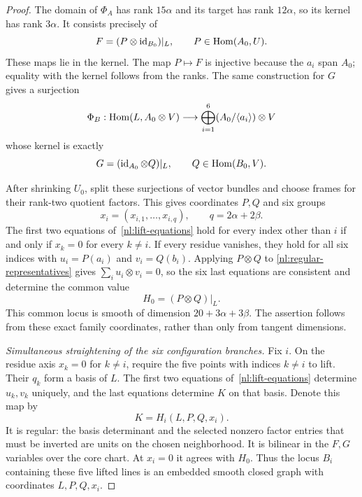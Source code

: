 \begin{proof}
The domain of $\Phi_A$ has rank $15\alpha$ and its target has rank
$12\alpha$, so its kernel has rank $3\alpha$. It consists precisely of
\begin{equation}\label{nl:kernel-A}
 F=(P\otimes\operatorname{id}_{B_0})|_L,
             \qquad P\in\operatorname{Hom}(A_0,U).
\end{equation}
These maps lie in the kernel. The map $P\mapsto F$ is injective because
the $a_i$ span $A_0$; equality with the kernel follows from the ranks.
The same construction for $G$ gives a surjection
\[
 \Phi_B:\operatorname{Hom}(L,A_0\otimes V)\longrightarrow
        \bigoplus_{i=1}^6(A_0/\langle a_i\rangle)\otimes V
\]
whose kernel is exactly
\begin{equation}\label{nl:kernel-B}
 G=(\operatorname{id}_{A_0}\otimes Q)|_L,
             \qquad Q\in\operatorname{Hom}(B_0,V).
\end{equation}

After shrinking $U_0$, split these surjections of vector bundles and
choose frames for their rank-two quotient factors. This gives coordinates
$P,Q$ and six groups
\[
 x_i=(x_{i,1},\ldots,x_{i,q}),\qquad
 q=2\alpha+2\beta.
\]
The first two equations of~\eqref{nl:lift-equations} hold for every
index other than $i$ if and only if $x_k=0$ for every $k\neq i$.
If every residue vanishes, they hold for all six indices with
$u_i=P(a_i)$ and $v_i=Q(b_i)$. Applying $P\otimes Q$ to
\eqref{nl:regular-representatives} gives
$\sum_i u_i\otimes v_i=0$, so the six last equations are consistent
and determine the common value
\begin{equation}\label{nl:common-K}
 H_0=(P\otimes Q)|_L.
\end{equation}
This common locus is smooth of dimension $20+3\alpha+3\beta$.
The assertion follows from these exact family coordinates, rather than
only from tangent dimensions.

\medskip
\emph{Simultaneous straightening of the six configuration branches.}
Fix $i$. On the residue axis $x_k=0$ for $k\neq i$, require the five
points with indices $k\neq i$ to lift. Their $q_k$ form a basis of $L$.
The first two equations of~\eqref{nl:lift-equations} determine $u_k,v_k$
uniquely, and the last equations determine $K$ on that basis. Denote
this map by
\[
 K=H_i(L,P,Q,x_i).
\]
It is regular: the basis determinant and the selected nonzero factor
entries that must be inverted are units on the chosen neighborhood.
It is bilinear in the $F,G$ variables over the core chart. At $x_i=0$
it agrees with $H_0$. Thus the locus $B_i$ containing these five
lifted lines is an embedded smooth closed graph with coordinates
$L,P,Q,x_i$.


\end{proof}
